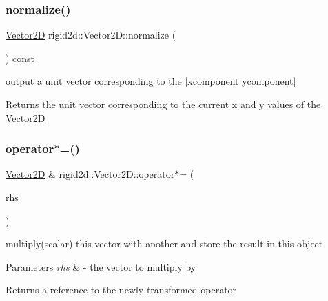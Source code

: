 \subsubsection{\texorpdfstring{normalize()}{normalize()}}
{\footnotesize\ttfamily \hyperlink{structrigid2d_1_1Vector2D}{Vector2D} rigid2d\+::\+Vector2\+D\+::normalize (\begin{DoxyParamCaption}{ }\end{DoxyParamCaption}) const}



output a unit vector corresponding to the \mbox{[}xcomponent ycomponent\mbox{]} 

\begin{DoxyReturn}{Returns}
the unit vector corresponding to the current x and y values of the \hyperlink{structrigid2d_1_1Vector2D}{Vector2D} 
\end{DoxyReturn}
\mbox{\label{structrigid2d_1_1Vector2D_a0da46fe8a92fcb6ecea09425c6ead294}} 
\subsubsection{\texorpdfstring{operator$\ast$=()}{operator*=()}}
{\footnotesize\ttfamily \hyperlink{structrigid2d_1_1Vector2D}{Vector2D} \& rigid2d\+::\+Vector2\+D\+::operator$\ast$= (\begin{DoxyParamCaption}\item[{const \hyperlink{structrigid2d_1_1Vector2D}{Vector2D} \&}]{rhs }\end{DoxyParamCaption})}



multiply(scalar) this vector with another and store the result in this object 


\begin{DoxyParams}{Parameters}
{\em rhs} & -\/ the vector to multiply by \\
\hline
\end{DoxyParams}
\begin{DoxyReturn}{Returns}
a reference to the newly transformed operator 
\end{DoxyReturn}
\mbox{\label{structrigid2d_1_1Vector2D_aa17e3466179575f598b77153cbfea9e6}} 
